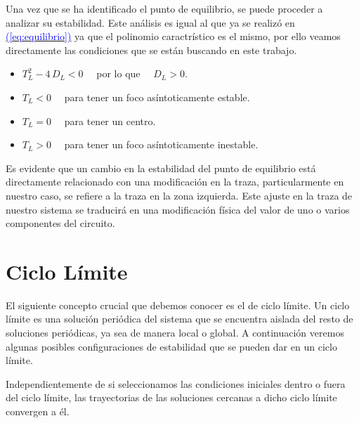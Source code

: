 \documentclass[12pt,a4paper]{report} %
\newcommand{\eref}[1]{\hyperref[#1]{\textcolor{blue}{(\ref*{#1})}}}
\begin{document}
\newpage
		
		 Una vez que se ha identificado el punto de equilibrio, se puede proceder a analizar su estabilidad. Este análisis es igual al que ya se realizó en \eref{eq:equilibrio} ya que el polinomio caractrístico es el mismo, por ello veamos directamente las condiciones que se están buscando en este trabajo.
		 
		\vspace{0.2cm}\begin{itemize}
			\item $T_L^2-4\,D_L<0\quad$ por lo que $\quad D_L>0$.
			\item $T_L<0\quad$ para tener un foco asíntoticamente estable.
			\item $T_L=0\quad$ para tener un centro.
			\item $T_L>0\quad$ para tener un foco asíntoticamente inestable.
		\end{itemize}\smallskip
		
		\vspace{0.5cm}Es evidente que un cambio en la estabilidad del punto de equilibrio está directamente relacionado con una modificación en la traza, particularmente en nuestro caso, se refiere a la traza en la zona izquierda. Este ajuste en la traza de nuestro sistema se traducirá en una modificación física del valor de uno o varios componentes del circuito.
		
		\section{Ciclo Límite}
		
		El siguiente concepto crucial que debemos conocer es el de ciclo límite. Un ciclo límite es una solución periódica del sistema que se encuentra aislada del resto de soluciones periódicas, ya sea de manera local o global. A continuación veremos algunas posibles configuraciones de estabilidad que se pueden dar en un ciclo límite.
		
		\newpage
		
		
		\vspace{0.5cm}Independientemente de si seleccionamos las condiciones iniciales dentro o fuera del ciclo límite, las trayectorias de las soluciones cercanas a dicho ciclo límite convergen a él.
		
\end{document}
